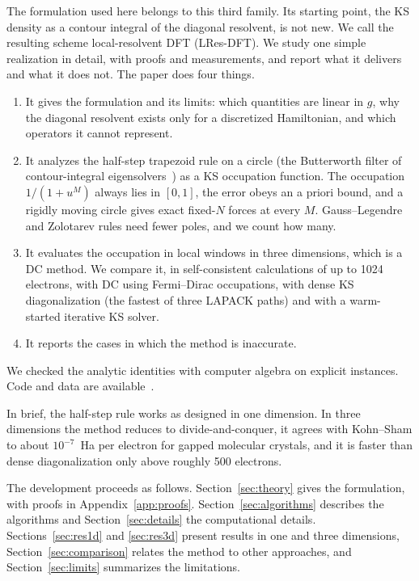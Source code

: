 \documentclass[aps,prb,twocolumn,superscriptaddress,floatfix,longbibliography]{revtex4-2}
\theoremstyle{remark}
\begin{document}
The formulation used here belongs to this third family. Its starting point, the KS density as a contour integral of the
diagonal resolvent, is not new. We call the resulting scheme local-resolvent DFT (LRes-DFT). We study one simple realization in detail, with proofs and
measurements, and report what it delivers and what it does not. The paper does four things.
\begin{enumerate}
\item It gives the formulation and its limits: which quantities are linear in $g$, why the diagonal resolvent exists only
for a discretized Hamiltonian, and which operators it cannot represent.
\item It analyzes the half-step trapezoid rule on a circle (the Butterworth filter of contour-integral
eigensolvers~\cite{Guettel2015}) as a KS occupation function. The occupation $1/(1+u^M)$ always lies in $[0,1]$, the error
obeys an a priori bound, and a rigidly moving circle gives exact fixed-$N$ forces at every $M$. Gauss--Legendre and
Zolotarev rules need fewer poles, and we count how many.
\item It evaluates the occupation in local windows in three dimensions, which is a DC method. We compare it, in
self-consistent calculations of up to 1024 electrons, with DC using Fermi--Dirac occupations, with dense KS diagonalization
(the fastest of three LAPACK paths) and with a warm-started iterative KS solver.
\item It reports the cases in which the method is inaccurate.
\end{enumerate}
We checked the analytic identities with computer algebra on explicit instances. Code and data are available~\cite{SM}.

In brief, the half-step rule works as designed in one dimension. In three dimensions the method reduces to divide-and-conquer, it agrees with Kohn--Sham to about $10^{-7}$~Ha per electron for gapped molecular crystals, and it is faster than dense diagonalization only above roughly 500 electrons.

The development proceeds as follows. Section~\ref{sec:theory} gives the formulation, with proofs in
Appendix~\ref{app:proofs}. Section~\ref{sec:algorithms} describes the algorithms and Section~\ref{sec:details} the
computational details. Sections~\ref{sec:res1d} and \ref{sec:res3d} present results in one and three dimensions,
Section~\ref{sec:comparison} relates the method to other approaches, and Section~\ref{sec:limits} summarizes the limitations.
\end{document}
